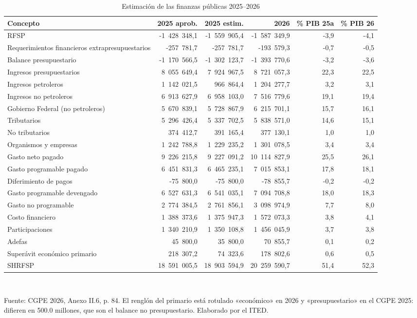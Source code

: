 \begin{table}[htbp]
\centering
\scriptsize
\caption{Estimación de las finanzas públicas 2025--2026}
\label{cua:C4_1}
\begin{tabular}{lrrrrr}
\toprule
\textbf{Concepto} & \textbf{2025 aprob.} & \textbf{2025 estim.} & \textbf{2026} & \textbf{\% PIB 25a} & \textbf{\% PIB 26} \\
\midrule
RFSP & -1 428 348,1 & -1 559 905,4 & -1 587 349,9 & -3,9 & -4,1 \\
Requerimientos financieros extrapresupuestarios & -257 781,7 & -257 781,7 & -193 579,3 & -0,7 & -0,5 \\
Balance presupuestario & -1 170 566,5 & -1 302 123,7 & -1 393 770,6 & -3,2 & -3,6 \\
Ingresos presupuestarios & 8 055 649,4 & 7 924 967,5 & 8 721 057,3 & 22,3 & 22,5 \\
Ingresos petroleros & 1 142 021,5 & 966 864,4 & 1 204 277,7 & 3,2 & 3,1 \\
Ingresos no petroleros & 6 913 627,9 & 6 958 103,0 & 7 516 779,6 & 19,1 & 19,4 \\
Gobierno Federal (no petroleros) & 5 670 839,1 & 5 728 867,9 & 6 215 701,1 & 15,7 & 16,1 \\
Tributarios & 5 296 426,4 & 5 337 702,5 & 5 838 571,0 & 14,6 & 15,1 \\
No tributarios & 374 412,7 & 391 165,4 & 377 130,1 & 1,0 & 1,0 \\
Organismos y empresas & 1 242 788,8 & 1 229 235,2 & 1 301 078,5 & 3,4 & 3,4 \\
Gasto neto pagado & 9 226 215,8 & 9 227 091,2 & 10 114 827,9 & 25,5 & 26,1 \\
Gasto programable pagado & 6 451 831,3 & 6 465 235,1 & 7 015 853,1 & 17,8 & 18,1 \\
Diferimiento de pagos & -75 800,0 & -75 800,0 & -78 855,7 & -0,2 & -0,2 \\
Gasto programable devengado & 6 527 631,3 & 6 541 035,1 & 7 094 708,8 & 18,0 & 18,3 \\
Gasto no programable & 2 774 384,5 & 2 761 856,1 & 3 098 974,9 & 7,7 & 8,0 \\
Costo financiero & 1 388 373,6 & 1 375 947,3 & 1 572 073,3 & 3,8 & 4,1 \\
Participaciones & 1 340 210,9 & 1 350 108,8 & 1 456 045,9 & 3,7 & 3,8 \\
Adefas & 45 800,0 & 35 800,0 & 70 855,7 & 0,1 & 0,2 \\
Superávit económico primario & 218 307,2 & 74 323,6 & 178 802,6 & 0,6 & 0,5 \\
SHRFSP & 18 591 005,5 & 18 903 594,9 & 20 259 590,7 & 51,4 & 52,3 \\
\bottomrule
\end{tabular}
\\[2pt]\begin{minipage}{0.92\textwidth}\scriptsize Fuente: CGPE 2026, Anexo II.6, p. 84. El renglón del primario está rotulado «económico» en 2026 y «presupuestario» en el CGPE 2025: difieren en 500.0 millones, que son el balance no presupuestario. Elaborado por el ITED.\end{minipage}
\end{table}
